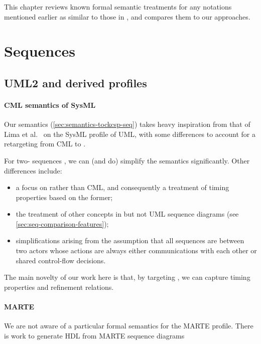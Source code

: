 
This chapter reviews known formal semantic treatments for any notations
mentioned earlier as similar to those in \langname, and compares them to
our approaches.

\section{Sequences}\label{sec:semantics-review-seq}

\subsection{UML2 and derived profiles}

\paragraph{CML semantics of SysML}

Our semantics (\cref{sec:semantics-tockcsp-seq}) takes heavy inspiration from
that of Lima et al.~\cite{lima-semantics} on the SysML profile of UML, with
some differences to account for a retargeting from CML to \tockcsp.

For two-\mactor{} sequences , we can (and do)
simplify the semantics significantly.  Other differences include:

\begin{itemize}
\item a focus on \tockcsp{} rather than CML, and consequently a
  treatment of timing properties based on the former;
\item
  the treatment of other concepts in \langname{} but not UML sequence
  diagrams (see \cref{sec:seq-comparison-features});
\item simplifications arising from the assumption that all sequences
  are between two actors whose actions are always either communications with
  each other or shared control-flow decisions.
\end{itemize}

The main novelty of our work here is that, by targeting \tockcsp, we can capture
timing properties and refinement relations.

\paragraph{MARTE}

We are not aware of a particular formal semantics for the MARTE profile.
There is work to generate HDL from MARTE sequence diagrams~

